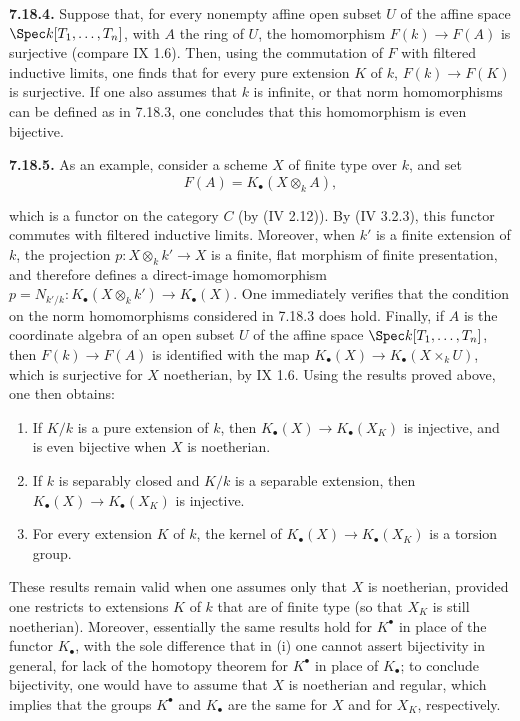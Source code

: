 \textbf{7.18.4.} Suppose that, for every nonempty affine open subset \(U\) of the affine space \(\Spec k[T_1,\ldots,T_n]\), with \(A\) the ring of \(U\), the homomorphism \(F(k)\to F(A)\) is surjective (compare IX 1.6). Then, using the commutation of \(F\) with filtered inductive limits, one finds that for every pure extension \(K\) of \(k\), \(F(k)\to F(K)\) is surjective. If one also assumes that \(k\) is infinite, or that norm homomorphisms can be defined as in 7.18.3, one concludes that this homomorphism is even bijective.

\textbf{7.18.5.} As an example, consider a scheme \(X\) of finite type over \(k\), and set
\[
  F(A)=K_\bullet(X\otimes_k A),
\]

%
which is a functor on the category \(C\) (by (IV 2.12)). By (IV 3.2.3), this functor commutes with filtered inductive limits. Moreover, when \(k'\) is a finite extension of \(k\), the projection \(p:X\otimes_k k'\to X\) is a finite, flat morphism of finite presentation, and therefore defines a direct-image homomorphism \(p=N_{k'/k}:K_\bullet(X\otimes_k k')\longrightarrow K_\bullet(X)\). One immediately verifies that the condition on the norm homomorphisms considered in 7.18.3 does hold. Finally, if \(A\) is the coordinate algebra of an open subset \(U\) of the affine space \(\Spec k[T_1,\ldots,T_n]\), then \(F(k)\to F(A)\) is identified with the map \(K_\bullet(X)\longrightarrow K_\bullet(X\times_k U)\), which is surjective for \(X\) noetherian, by IX 1.6. Using the results proved above, one then obtains:
\begin{enumerate}[label=(\roman*)]
\item If \(K/k\) is a pure extension of \(k\), then \(K_\bullet(X)\longrightarrow K_\bullet(X_K)\) is injective, and is even bijective when \(X\) is noetherian.
\item If \(k\) is separably closed and \(K/k\) is a separable extension, then \(K_\bullet(X)\longrightarrow K_\bullet(X_K)\) is injective.
\item For every extension \(K\) of \(k\), the kernel of \(K_\bullet(X)\longrightarrow K_\bullet(X_K)\) is a torsion group.
\end{enumerate}
These results remain valid when one assumes only that \(X\) is noetherian, provided one restricts to extensions \(K\) of \(k\) that are of finite type (so that \(X_K\) is still noetherian). Moreover, essentially the same results hold for \(K^\bullet\) in place of the functor \(K_\bullet\), with the sole difference that in (i) one cannot assert bijectivity in general, for lack of the homotopy theorem for \(K^\bullet\) in place of \(K_\bullet\); to conclude bijectivity, one would have to assume that \(X\) is noetherian and regular, which implies that the groups \(K^\bullet\) and \(K_\bullet\) are the same for \(X\) and for \(X_K\), respectively.

